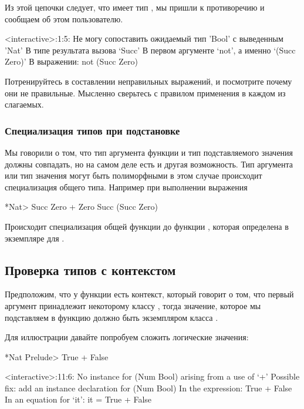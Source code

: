 Из этой цепочки следует, что  имеет тип ,
мы пришли к противоречию и сообщаем об этом пользователю.

\begin{code}
<interactive>:1:5:
    Не могу сопоставить ожидаемый тип 'Bool' с выведенным 'Nat'
    В типе результата вызова `Succ'
	В первом аргументе `not', а именно `(Succ Zero)'
    В выражении: not (Succ Zero)	
\end{code}

Потренируйтесь в составлении неправильных выражений,
и посмотрите почему они не правильные. Мысленно сверьтесь с
правилом применения в каждом из слагаемых.

\subsubsection{Специализация типов при подстановке}

Мы говорили о том, что тип аргумента функции и тип подставляемого
значения должны совпадать, но на самом деле есть и другая
возможность. Тип аргумента или тип значения могут быть 
полиморфными в этом случае происходит специализация 
общего типа. Например при выполнении выражения

\begin{code}
*Nat> Succ Zero + Zero
Succ (Succ Zero)
\end{code}

Происходит специализация общей функции 
до функции , которая определена 
в экземпляре  для .

\subsection{Проверка типов с контекстом}

Предположим, что у функции  есть контекст, который
говорит о том, что первый аргумент принадлежит некоторому
классу ,  тогда значение, которое
мы подставляем в функцию должно быть экземпляром класса .

Для иллюстрации давайте попробуем сложить логические значения:

\begin{code}
*Nat Prelude> True + False

<interactive>:11:6:
    No instance for (Num Bool)
      arising from a use of `+'
    Possible fix: add an instance declaration for (Num Bool)
    In the expression: True + False
    In an equation for `it': it = True + False
\end{code}

